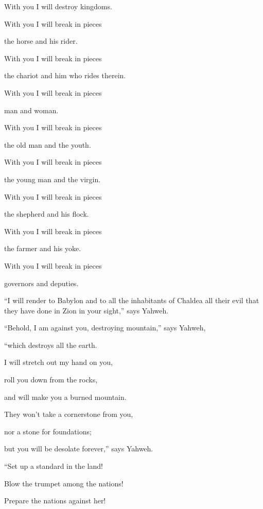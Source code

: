 {\par }{\QB With you I will destroy kingdoms.
\par }{\Q {}With you I will break in pieces
\par }{\QB the horse and his rider.
\par }{\Q {}With you I will break in pieces
\par }{\QB the chariot and him who rides therein.
\par }{\Q With you I will break in pieces
\par }{\QB man and woman.
\par }{\Q With you I will break in pieces
\par }{\QB the old man and the youth.
\par }{\Q With you I will break in pieces
\par }{\QB the young man and the virgin.
\par }{\Q {}With you I will break in pieces
\par }{\QB the shepherd and his flock.
\par }{\Q With you I will break in pieces
\par }{\QB the farmer and his yoke.
\par }{\Q With you I will break in pieces
\par }{\QB governors and deputies.
\par }{\PP {}“I will render to Babylon and to all the inhabitants of Chaldea all their evil that they have done in Zion in your sight,” says Yahweh.
\par }{\Q {}“Behold, I am against you, destroying mountain,” says Yahweh,
\par }{\QB “which destroys all the earth.
\par }{\Q I will stretch out my hand on you,
\par }{\QB roll you down from the rocks,
\par }{\QB and will make you a burned mountain.
\par }{\Q {}They won’t take a cornerstone from you,
\par }{\QB nor a stone for foundations;
\par }{\QB but you will be desolate forever,” says Yahweh.
\par }{\BB \par }{\Q {}“Set up a standard in the land!
\par }{\QB Blow the trumpet among the nations!
\par }{\Q Prepare the nations against her!
}
